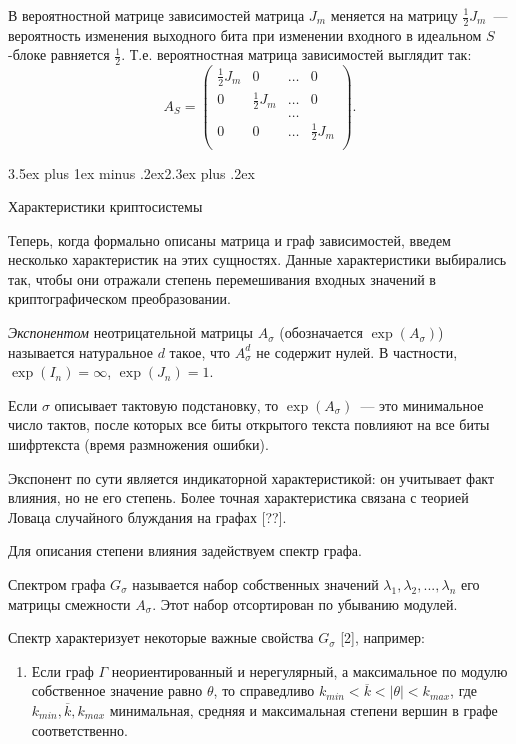 \documentclass[a4paper,12pt]{report}
\makeatletter
\theoremstyle{plain} %
\theoremstyle{definition}
\theoremstyle{remark}
\renewcommand{\section}{\@startsection{section}{1}{18pt}%
{3.5ex plus 1ex minus .2ex}{2.3ex plus .2ex}%
{\normalfont\Large\bfseries\raggedright}}%
\makeatother
\begin{document}
\begin{large}
В вероятностной матрице зависимостей матрица 
$J_m$ меняется на матрицу $\frac{1}{2}J_m$~---
вероятность изменения выходного бита при изменении 
входного в идеальном $S$-блоке равняется $\frac{1}{2}$. Т.е. вероятностная матрица зависимостей выглядит так:
$$
A_S = 
\begin{pmatrix} 
\frac{1}{2}J_m & 0 & \ldots & 0\\ 
0 &\frac{1}{2} J_m & \ldots & 0\\
  &     & \ldots &\\
0 &  0  & \ldots & \frac{1}{2}J_m\\
\end{pmatrix}.
$$

\section{Характеристики криптосистемы}

Теперь, когда формально описаны матрица и граф зависимостей, введем несколько характеристик на этих сущностях. Данные характеристики выбирались так, чтобы они отражали степень перемешивания входных значений в криптографическом преобразовании.

{\it Экспонентом} неотрицательной матрицы $A_\sigma$
(обозначается $\exp(A_\sigma)$)
называется натуральное $d$ такое, что 
$A_\sigma^d$ не содержит нулей.
В частности, $\exp(I_n)=\infty$, $\exp(J_n)=1$.

Если $\sigma$ описывает тактовую подстановку,
то $\exp(A_\sigma)$~--- это минимальное число тактов,
после которых все биты открытого текста повлияют 
на все биты шифртекста (время размножения ошибки).


Экспонент по сути является индикаторной характеристикой:
он учитывает факт влияния, но не его степень.
Более точная характеристика связана с теорией Ловаца
случайного блуждания на графах [??].

Для описания степени влияния задействуем спектр графа.

Спектром графа $G_{\sigma}$ называется набор собственных значений $\lambda_1, \lambda_2,...,\lambda_n$ его матрицы смежности $A_{\sigma}$. Этот набор отсортирован по убыванию модулей. 

Спектр характеризует некоторые важные свойства $G_{\sigma}$ [2], например:

\begin{enumerate}

\item Если граф $\Gamma$ неориентированный и нерегулярный, а максимальное по модулю собственное значение равно $\theta$, то справедливо $k_{min} < \overline{k} < |\theta| < k_{max}$, где $k_{min}, \overline{k}, k_{max}$ минимальная, средняя и максимальная степени вершин в графе соответственно.


\end{enumerate}
\end{large}
\end{document}
